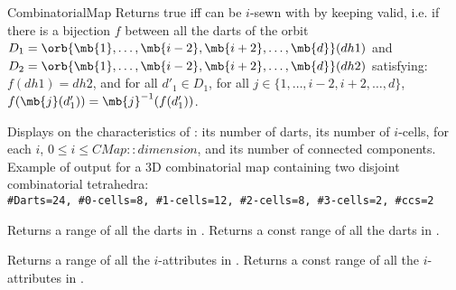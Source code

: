 \begin{ccRefConcept}{CombinatorialMap}
         {Returns true iff  can be $i$-sewn with  by 
           keeping  valid, i.e. if there is
           a bijection $f$ between all the darts of the orbit
           $D_1=\orb{\mb{1},\ldots,\mb{i-2},\mb{i+2},\ldots,\mb{d}}(dh1)$ and
           $D_2=\orb{\mb{1},\ldots,\mb{i-2},\mb{i+2},\ldots,\mb{d}}(dh2)$
           satisfying: $f(dh1)=dh2$, and for all $d'_1 \in D_1$, for all $j\in
           \{1,\ldots,i-2,i+2,\ldots,d\}$,
           $f(\mb{j}(d'_1))=\mb{j}^{-1}(f(d'_1))$.           
          }

{Displays on  the characteristics of : its number of darts, 
  its number of $i$-cells, for each $i$, $0\leq i\leq CMap::dimension$, 
  and its number of connected components.}
Example of output for a 3D combinatorial map containing two disjoint
combinatorial tetrahedra:\\
\texttt{\#Darts=24, \#0-cells=8, \#1-cells=12, \#2-cells=8, \#3-cells=2, \#ccs=2}



    {Returns a range of all the darts in .}
\ccGlue
{}
    {Returns a const range of all the darts in .}

   {Returns a range of all the $i$-attributes in .
     }
\ccGlue
{}
   {Returns a const range of all the  $i$-attributes in .
     }

 

\end{ccRefConcept}
